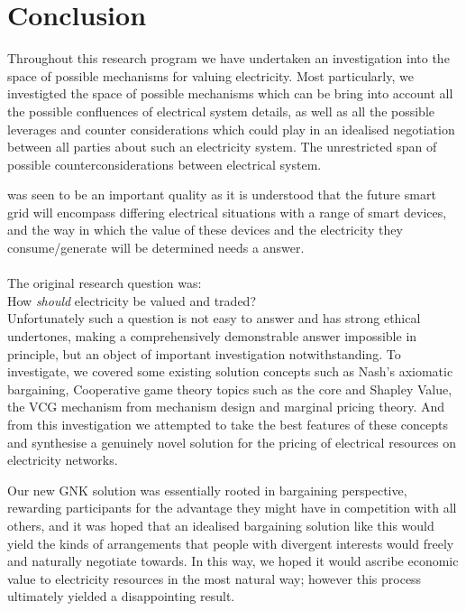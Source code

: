 \chapter{Conclusion}
\label{cha:conc}

Throughout this research program we have undertaken an investigation into the space of possible mechanisms for valuing electricity.
Most particularly, we investigted the space of possible mechanisms which can be bring into account all the possible confluences of electrical system details, as well as all the possible leverages and counter considerations which could play in an idealised negotiation between all parties about such an electricity system.
The unrestricted span of possible counterconsiderations between electrical system.%



 was seen to be an important quality as it is understood that the future smart grid will encompass differing electrical situations with a range of smart devices, and the way in which the value of these devices and the electricity they consume/generate will be determined needs a answer.\\
\\\noindent
The original research question was:\\
\-\hspace{1cm}How \textit{should} electricity be valued and traded?\\

Unfortunately such a question is not easy to answer and has strong ethical undertones, making a comprehensively demonstrable answer impossible in principle, but an object of important investigation notwithstanding.
To investigate, we covered some existing solution concepts such as Nash's axiomatic bargaining, Cooperative game theory topics such as the core and Shapley Value, the VCG mechanism from mechanism design and marginal pricing theory.
And from this investigation we attempted to take the best features of these concepts and synthesise a genuinely novel solution for the pricing of electrical resources on electricity networks.

Our new GNK solution was essentially rooted in bargaining perspective, rewarding participants for the advantage they might have in competition with all others, 
and it was hoped that an idealised bargaining solution like this would yield the kinds of arrangements that people with divergent interests would freely and naturally negotiate towards.
In this way, we hoped it would ascribe economic value to electricity resources in the most natural way; however this process ultimately yielded a disappointing result.

